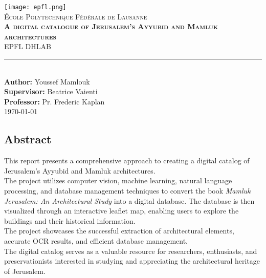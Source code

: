 \documentclass[11pt,titlepage]{report}
\begin{document}
\begin{titlepage}
	\centering
    \texttt{[image: epfl.png]}\\[0.25cm] 	%
    \textsc{\LARGE École Polytechnique Fédérale de Lausanne}\\ \vspace{\fill}
    \textbf{\textsc{\fontsize{25}{25}\selectfont A digital catalogue of Jerusalem’s Ayyubid and Mamluk architectures}}\\ \vspace{\fill}		
	\textsc{\LARGE EPFL DHLAB}\\[0.4cm]
	\rule{\linewidth}{0.2 mm} \\[0.5 cm]
	\textbf{Author:} Youssef Mamlouk \\ [0.5 cm]
 \textbf{Supervisor:} Beatrice Vaienti \\
\textbf{Professor:} Pr. Frederic Kaplan \\[1.5cm] \today
\end{titlepage}
\restoregeometry

\thispagestyle{numberonly}
\begin{summary}
\section*{Abstract}

This report presents a comprehensive approach to creating a digital catalog of Jerusalem's Ayyubid and Mamluk architectures. \\

The project utilizes computer vision, machine learning, natural language processing, and database management techniques to convert the book \textit{Mamluk Jerusalem: An Architectural Study} into a digital database. The database is then visualized through an interactive leaflet map, enabling users to explore the buildings and their historical information. \\

The project showcases the successful extraction of architectural elements, accurate OCR results, and efficient database management. \\
The digital catalog serves as a valuable resource for researchers, enthusiasts, and preservationists interested in studying and appreciating the architectural heritage of Jerusalem.
\end{summary}

\clearpage

\tableofcontents
\end{document}
